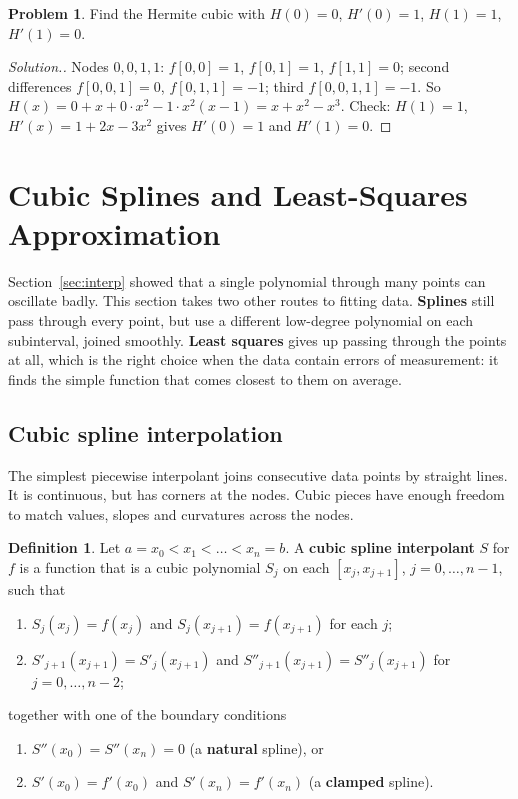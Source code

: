 \documentclass[11pt,a4paper]{article}
\numberwithin{equation}{section}
\theoremstyle{definition}
\newtheorem{defn}[thm]{Definition}
\newtheorem{problemx}{Problem}[subsection]
\newenvironment{problem}{\begin{problemx}}{\end{problemx}}
\newenvironment{solution}
  {\renewcommand{\qedsymbol}{}\begin{proof}[\textit{Solution}.]}
  {\end{proof}}
\begin{document}
\begin{problem}
Find the Hermite cubic with $H(0) = 0$, $H'(0) = 1$, $H(1) = 1$, $H'(1) = 0$.
\end{problem}
\begin{solution}
Nodes $0,0,1,1$: $f[0,0] = 1$, $f[0,1] = 1$, $f[1,1] = 0$; second differences $f[0,0,1] = 0$, $f[0,1,1] = -1$; third $f[0,0,1,1] = -1$. So
$H(x) = 0+x+0\cdot x^2-1\cdot x^2(x-1) = x+x^2-x^3$. Check: $H(1) = 1$, $H'(x) = 1+2x-3x^2$ gives $H'(0) = 1$ and $H'(1) = 0$.
\end{solution}


\section{Cubic Splines and Least-Squares Approximation}
\label{sec:splines}

Section~\ref{sec:interp} showed that a single polynomial through many points can oscillate badly. This section takes two other routes to
fitting data. \textbf{Splines} still pass through every point, but use a different low-degree polynomial on each subinterval, joined
smoothly. \textbf{Least squares} gives up passing through the points at all, which is the right choice when the data contain errors of
measurement: it finds the simple function that comes closest to them on average.


\subsection{Cubic spline interpolation}
\label{sec:cubicspline}

The simplest piecewise interpolant joins consecutive data points by straight lines. It is continuous, but has corners at the nodes. Cubic
pieces have enough freedom to match values, slopes and curvatures across the nodes.

\begin{defn}
Let $a = x_0<x_1<\dots<x_n = b$. A \textbf{cubic spline interpolant} $S$ for $f$ is a function that is a cubic polynomial $S_j$ on each
$[x_j,x_{j+1}]$, $j = 0,\dots,n-1$, such that
\begin{enumerate}
\item[(a)] $S_j(x_j) = f(x_j)$ and $S_j(x_{j+1}) = f(x_{j+1})$ for each $j$;
\item[(b)] $S'_{j+1}(x_{j+1}) = S'_j(x_{j+1})$ and $S''_{j+1}(x_{j+1}) = S''_j(x_{j+1})$ for $j = 0,\dots,n-2$;
\end{enumerate}
together with one of the boundary conditions
\begin{enumerate}
\item[(c)] $S''(x_0) = S''(x_n) = 0$ (a \textbf{natural} spline), or
\item[(d)] $S'(x_0) = f'(x_0)$ and $S'(x_n) = f'(x_n)$ (a \textbf{clamped} spline).
\end{enumerate}
\end{defn}
\end{document}
